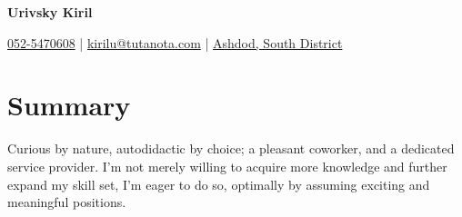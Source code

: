 \documentclass[
	12pt,a4paper %
]{article}
\begin{document}
\begin{center}
				{\Huge{\textbf{Urivsky Kiril}}}

\vspace{2pt}
\colorbox{shade}{ %
\raisebox{-1pt}{\faPhone} \href{tel:972525470608}{052-5470608} | \raisebox{0pt}{\small\faEnvelope} \href{mailto:kirilu@tutanota.com}{kirilu@tutanota.com} | \raisebox{0pt}{\faHome} \href{https://goo.gl/maps/MSacjpSy7vZSKykP7}{Ashdod, South District}
}
\end{center}
\section{Summary}
Curious by nature, autodidactic by choice; a pleasant
coworker, and a dedicated service provider. I'm not merely willing to acquire more knowledge and further expand my skill set, I'm eager to do so, optimally by assuming exciting and meaningful positions.
\end{document}
